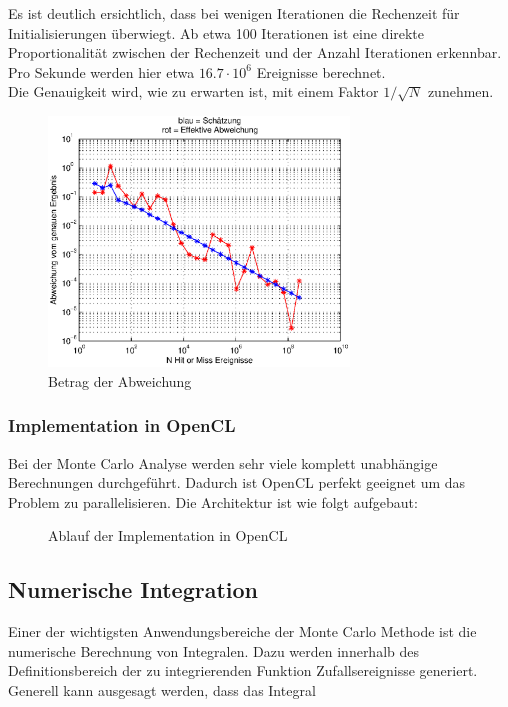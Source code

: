 \documentclass{book}
\begin{document}
\begin{refsection}
Es ist deutlich ersichtlich, dass bei wenigen Iterationen die Rechenzeit für Initialisierungen überwiegt. Ab etwa 100 Iterationen ist eine direkte Proportionalität zwischen der Rechenzeit und der Anzahl Iterationen erkennbar. Pro Sekunde werden hier etwa $16.7 \cdot 10^6$ Ereignisse berechnet. \\

Die Genauigkeit wird, wie zu erwarten ist, mit einem Faktor $1/\sqrt{N}$ zunehmen. 
\begin{figure}[h]
    \centering
    \includegraphics[width=8cm]{images/Fehler.eps}
    \caption{Betrag der Abweichung}
    \label{fig:Fehler}
\end{figure}

\subsubsection{Implementation in OpenCL}
Bei der Monte Carlo Analyse werden sehr viele komplett unabhängige Berechnungen durchgeführt. Dadurch ist OpenCL perfekt geeignet um das Problem zu parallelisieren. Die Architektur ist wie folgt aufgebaut:

\begin{figure}[htbp]
	\centering
	\caption{Ablauf der Implementation in OpenCL}
	\label{fig:AblaufOpenCL}
\end{figure}




\clearpage
\subsection{Numerische Integration} \label{subsec:numIntegration}
Einer der wichtigsten Anwendungsbereiche der Monte Carlo Methode ist die numerische Berechnung von Integralen. Dazu werden innerhalb des Definitionsbereich der zu integrierenden Funktion Zufallsereignisse generiert. Generell kann ausgesagt werden, dass das Integral


\end{refsection}
\end{document}
